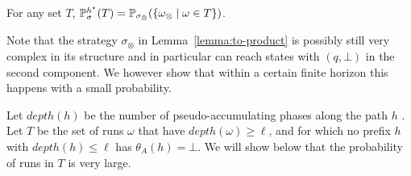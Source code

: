 \documentclass[a4paper,UKenglish]{lipics}
\renewcommand{\Pr}[3][]{\ifblank{#1}{\mathbb{P}_{#2}}{\mathbb{P}^{#1}_{#2}}(#3)}
\newcommand{\fix}[1]{{#1^\star}}
\newcommand{\fixh}{\fix{h}}
\newcommand{\depth}{\mathit{depth}}
\newcommand{\thetaa}{\theta_A}
\begin{document}
\begin{lemma}\label{lemma:to-product}
	
	For any set $T$,
	$\Pr[\fixh]{\sigma}{T} = \Pr{\sigma_\otimes}{\{\omega_\otimes\mid \omega\in T\}}$.
\end{lemma}

Note that the strategy $\sigma_\otimes$ in Lemma~\ref{lemma:to-product} is possibly still very complex in
its structure and in particular can reach states with $(q,\bot)$ in the second component. We however show that within a certain finite horizon
this happens with a small probability.

Let $\depth(h)$ be the number of pseudo-accumulating phases along the path $h$ . Let
$T$ be the set of runs $\omega$ that have $\depth(\omega) \ge \ell$, and for which no prefix $h$ with $\depth(h) \le \ell$ has $\thetaa(h) = \bot$.
We will show below that the probability of runs in $T$ is very large. 
\end{document}
